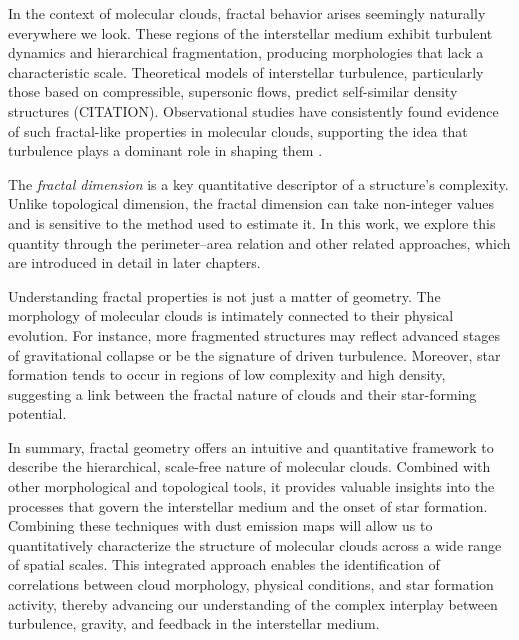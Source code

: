 In the context of molecular clouds, fractal behavior arises seemingly naturally everywhere we look. These regions of the interstellar medium exhibit turbulent dynamics and hierarchical fragmentation, producing morphologies that lack a characteristic scale. Theoretical models of interstellar turbulence, particularly those based on compressible, supersonic flows, predict self-similar density structures (CITATION). Observational studies have consistently found evidence of such fractal-like properties in molecular clouds, supporting the idea that turbulence plays a dominant role in shaping them \cite{elmegreen1996fractal, falgarone1991hierarchical}.

The \emph{fractal dimension} is a key quantitative descriptor of a structure's complexity.  Unlike topological dimension, the fractal dimension can take non-integer values and is sensitive to the method used to estimate it. In this work, we explore this quantity through the perimeter–area relation and other related approaches, which are introduced in detail in later chapters.

Understanding fractal properties is not just a matter of geometry. The morphology of molecular clouds is intimately connected to their physical evolution. For instance, more fragmented structures may reflect advanced stages of gravitational collapse or be the signature of driven turbulence. Moreover, star formation tends to occur in regions of low complexity and high density, suggesting a link between the fractal nature of clouds and their star-forming potential.

In summary, fractal geometry offers an intuitive and quantitative framework to describe the hierarchical, scale-free nature of molecular clouds. Combined with other morphological and topological tools, it provides valuable insights into the processes that govern the interstellar medium and the onset of star formation. Combining these techniques with dust emission maps will allow us to quantitatively characterize the structure of molecular clouds across a wide range of spatial scales. This integrated approach enables the identification of correlations between cloud morphology, physical conditions, and star formation activity, thereby advancing our understanding of the complex interplay between turbulence, gravity, and feedback in the interstellar medium.